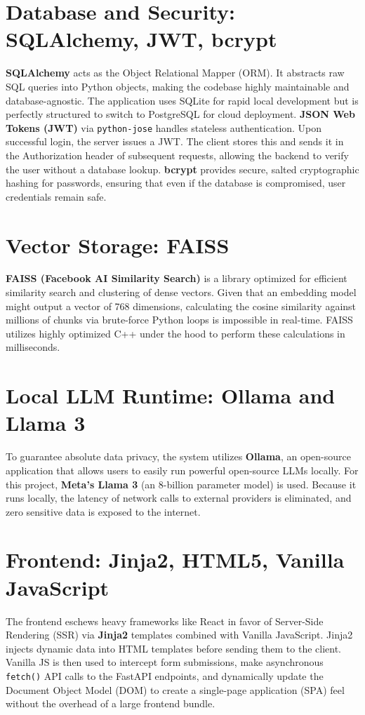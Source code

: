 \documentclass[12pt, a4paper]{report}
\begin{document}
\section{Database and Security: SQLAlchemy, JWT, bcrypt}
\textbf{SQLAlchemy} acts as the Object Relational Mapper (ORM). It abstracts raw SQL queries into Python objects, making the codebase highly maintainable and database-agnostic. The application uses SQLite for rapid local development but is perfectly structured to switch to PostgreSQL for cloud deployment.
\textbf{JSON Web Tokens (JWT)} via \texttt{python-jose} handles stateless authentication. Upon successful login, the server issues a JWT. The client stores this and sends it in the Authorization header of subsequent requests, allowing the backend to verify the user without a database lookup.
\textbf{bcrypt} provides secure, salted cryptographic hashing for passwords, ensuring that even if the database is compromised, user credentials remain safe.

\section{Vector Storage: FAISS}
\textbf{FAISS (Facebook AI Similarity Search)} is a library optimized for efficient similarity search and clustering of dense vectors. Given that an embedding model might output a vector of 768 dimensions, calculating the cosine similarity against millions of chunks via brute-force Python loops is impossible in real-time. FAISS utilizes highly optimized C++ under the hood to perform these calculations in milliseconds.

\section{Local LLM Runtime: Ollama and Llama 3}
To guarantee absolute data privacy, the system utilizes \textbf{Ollama}, an open-source application that allows users to easily run powerful open-source LLMs locally. For this project, \textbf{Meta's Llama 3} (an 8-billion parameter model) is used. Because it runs locally, the latency of network calls to external providers is eliminated, and zero sensitive data is exposed to the internet.

\section{Frontend: Jinja2, HTML5, Vanilla JavaScript}
The frontend eschews heavy frameworks like React in favor of Server-Side Rendering (SSR) via \textbf{Jinja2} templates combined with Vanilla JavaScript. Jinja2 injects dynamic data into HTML templates before sending them to the client. Vanilla JS is then used to intercept form submissions, make asynchronous \texttt{fetch()} API calls to the FastAPI endpoints, and dynamically update the Document Object Model (DOM) to create a single-page application (SPA) feel without the overhead of a large frontend bundle.
\end{document}
